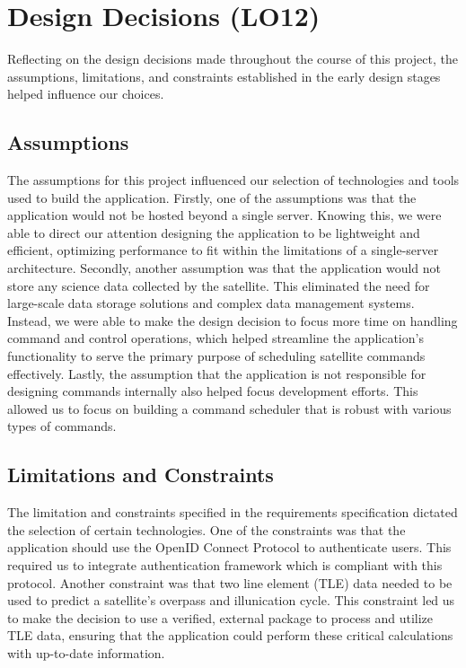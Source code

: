 \documentclass{article}
\begin{document}
\section{Design Decisions (LO12)}

Reflecting on the design decisions made throughout the course of this project, the assumptions, limitations, and constraints established in the early design stages helped influence our choices.

\subsection{Assumptions}

The assumptions for this project influenced our selection of technologies and tools used to build the application. Firstly, one of the assumptions was that the application would not be hosted beyond a single server. Knowing this, we were able to direct our attention designing the application to be lightweight and efficient, optimizing performance to fit within the limitations of a single-server architecture. Secondly, another  assumption was that the application would not store any science data collected by the satellite. This eliminated the need for large-scale data storage solutions and complex data management systems. Instead, we were able to make the design decision to focus more time on handling command and control operations, which helped streamline the application's functionality to serve the primary purpose of scheduling satellite commands effectively. Lastly, the assumption that the application is not responsible for designing commands internally also helped focus development efforts. This allowed us to focus on building a command scheduler that is robust with various types of commands.

\subsection{Limitations and Constraints}
The limitation and constraints specified in the requirements specification dictated the selection of certain technologies. One of the constraints was that the application should use the OpenID Connect Protocol to authenticate users. This required us to integrate authentication framework which is compliant with this protocol. Another constraint was that two line element (TLE) data needed to be used to predict a satellite's overpass and illunication cycle. This constraint led us to make the decision to use a verified, external package to process and utilize TLE data, ensuring that the application could perform these critical calculations with up-to-date information.
\end{document}

